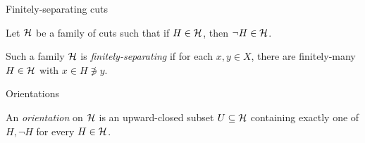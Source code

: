\documentclass{beamer}
\begin{document}
\begin{frame}{Finitely-separating cuts}
        \vspace{-0.2in}
        \pause

        Let $\mathcal{H}$ be a family of cuts such that if $H\in\mathcal{H}$, then $\lnot H\in\mathcal{H}$.

        \pause

        \begin{definition}
            Such a family $\mathcal{H}$ is \textit{finitely-separating} if for each $x,y\in X$, there are finitely-many $H\in\mathcal{H}$ with $x\in H\not\ni y$.
        \end{definition}
    \end{frame}
    \begin{frame}{Orientations}
        \begin{definition}
            An \textit{orientation} on $\mathcal{H}$ is an upward-closed subset $U\subseteq\mathcal{H}$ containing exactly one of $H,\lnot H$ for every $H\in\mathcal{H}$.
        \end{definition}

        \vspace{-0.2in}


\end{frame}
\end{document}
